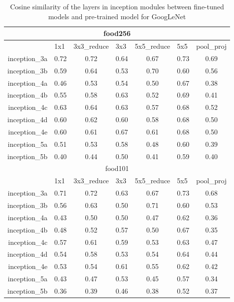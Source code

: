 \begin{table}[htbp]
  \centering
  \caption{Cosine similarity of the layers in inception modules between fine-tuned models and pre-trained model for GoogLeNet}
    \begin{tabular}{|r|cccccc|}
	\hline
    \multicolumn{7}{|c|}{food256} \\\hline

          & \multicolumn{1}{l}{1x1} & \multicolumn{1}{l}{3x3\_reduce} & \multicolumn{1}{l}{3x3} & \multicolumn{1}{l}{5x5\_reduce} & \multicolumn{1}{l}{5x5} & \multicolumn{1}{l|}{pool\_proj } \\\hline
    inception\_3a & 0.72  & 0.72  & 0.64  & 0.67  & 0.73  & 0.69 \\
    inception\_3b & 0.59  & 0.64  & 0.53  & 0.70  & 0.60  & 0.56 \\
    inception\_4a & 0.46  & 0.53  & 0.54  & 0.50  & 0.67  & 0.38 \\
    inception\_4b & 0.55  & 0.58  & 0.63  & 0.52  & 0.69  & 0.41 \\
    inception\_4c & 0.63  & 0.64  & 0.63  & 0.57  & 0.68  & 0.52 \\
    inception\_4d & 0.60  & 0.62  & 0.60  & 0.58  & 0.68  & 0.50 \\
    inception\_4e & 0.60  & 0.61  & 0.67  & 0.61  & 0.68  & 0.50 \\
    inception\_5a & 0.51  & 0.53  & 0.58  & 0.48  & 0.60  & 0.39 \\
    inception\_5b & 0.40  & 0.44  & 0.50  & 0.41  & 0.59  & 0.40 \\  \hline
    \multicolumn{7}{|c|}{food101} \\ \hline
          & \multicolumn{1}{l}{1x1 } & \multicolumn{1}{l}{3x3\_reduce} & \multicolumn{1}{l}{3x3} & \multicolumn{1}{l}{5x5\_reduce} & \multicolumn{1}{l}{5x5} & \multicolumn{1}{l|}{pool\_proj } \\\hline
    inception\_3a & 0.71  & 0.72  & 0.63  & 0.67  & 0.73  & 0.68 \\
    inception\_3b & 0.56  & 0.63  & 0.50  & 0.71  & 0.60  & 0.53 \\
    inception\_4a & 0.43  & 0.50  & 0.50  & 0.47  & 0.62  & 0.36 \\
    inception\_4b & 0.48  & 0.52  & 0.57  & 0.50  & 0.67  & 0.35 \\
    inception\_4c & 0.57  & 0.61  & 0.59  & 0.53  & 0.63  & 0.47 \\
    inception\_4d & 0.54  & 0.58  & 0.53  & 0.54  & 0.64  & 0.44 \\
    inception\_4e & 0.53  & 0.54  & 0.61  & 0.55  & 0.62  & 0.42 \\
    inception\_5a & 0.43  & 0.47  & 0.53  & 0.45  & 0.57  & 0.34 \\
    inception\_5b & 0.36  & 0.39  & 0.46  & 0.38  & 0.52  & 0.37 \\
    \hline
    \end{tabular}%
  \label{tab:cosg}%
\end{table}%


